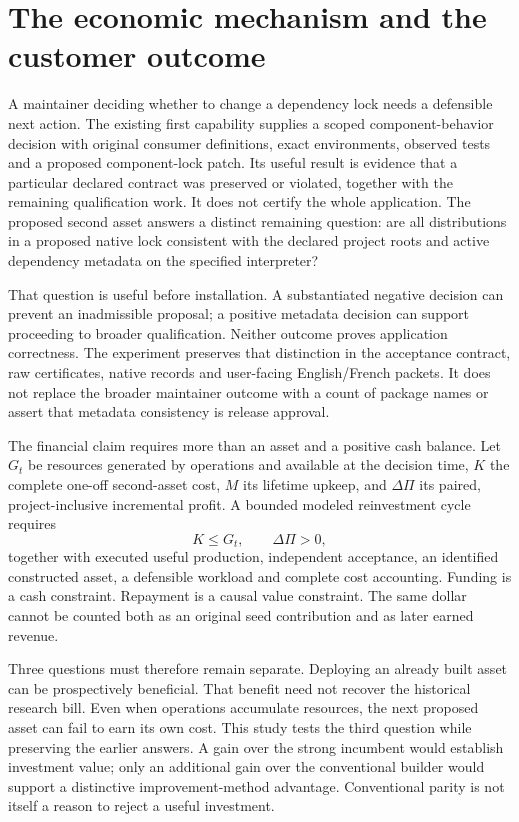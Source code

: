 \documentclass[11pt,letterpaper]{article}
\begin{document}
\section{The economic mechanism and the customer outcome}

A maintainer deciding whether to change a dependency lock needs a defensible next action. The existing first capability supplies a scoped component-behavior decision with original consumer definitions, exact environments, observed tests and a proposed component-lock patch. Its useful result is evidence that a particular declared contract was preserved or violated, together with the remaining qualification work. It does not certify the whole application. The proposed second asset answers a distinct remaining question: are all distributions in a proposed native lock consistent with the declared project roots and active dependency metadata on the specified interpreter?

That question is useful before installation. A substantiated negative decision can prevent an inadmissible proposal; a positive metadata decision can support proceeding to broader qualification. Neither outcome proves application correctness. The experiment preserves that distinction in the acceptance contract, raw certificates, native records and user-facing English/French packets. It does not replace the broader maintainer outcome with a count of package names or assert that metadata consistency is release approval.

The financial claim requires more than an asset and a positive cash balance. Let $G_t$ be resources generated by operations and available at the decision time, $K$ the complete one-off second-asset cost, $M$ its lifetime upkeep, and $\Delta\Pi$ its paired, project-inclusive incremental profit. A bounded modeled reinvestment cycle requires
\begin{equation}
K\leq G_t,\qquad \Delta\Pi>0,
\end{equation}
together with executed useful production, independent acceptance, an identified constructed asset, a defensible workload and complete cost accounting. Funding is a cash constraint. Repayment is a causal value constraint. The same dollar cannot be counted both as an original seed contribution and as later earned revenue.

Three questions must therefore remain separate. Deploying an already built asset can be prospectively beneficial. That benefit need not recover the historical research bill. Even when operations accumulate resources, the next proposed asset can fail to earn its own cost. This study tests the third question while preserving the earlier answers. A gain over the strong incumbent would establish investment value; only an additional gain over the conventional builder would support a distinctive improvement-method advantage. Conventional parity is not itself a reason to reject a useful investment.
\end{document}
